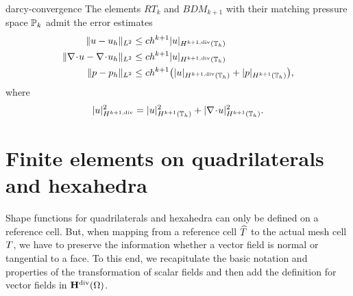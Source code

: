 \begin{Corollary}{darcy-convergence}
  The elements $RT_k$ and $BDM_{k+1}$ with their matching pressure
  space $\P_k$ admit the error estimates
  \begin{align}
    \norm{u-u_h}_{L^2} &\le c h^{k+1} \snorm{u}_{H^{k+1,\text{div}}(\mesh_h)} \\
    \norm{\div u-\div u_h}_{L^2} &\le c h^{k+1} \snorm{u}_{H^{k+1,\text{div}}(\mesh_h)} \\
    \norm{p-p_h}_{L^2} &\le c h^{k+1}
                         \bigl(\snorm{u}_{H^{k+1,\text{div}}(\mesh_h)}
    + \snorm{p}_{H^{k+1}(\mesh_h)} \bigr),
  \end{align}
  where
  \begin{gather}
    \snorm{u}_{H^{k+1,\text{div}}}^2 = \snorm{u}_{H^{k+1}(\mesh_h)}^2
    + \snorm{\div u}_{H^{k+1}(\mesh_h)}^2.
  \end{gather}
\end{Corollary}

\section{Finite elements on quadrilaterals and hexahedra}

\begin{intro}
  Shape functions for quadrilaterals and hexahedra can only be defined
  on a reference cell. But, when mapping from a reference cell
  $\refcell$ to the actual mesh cell $\cell$, we have to preserve the
  information whether a vector field is normal or tangential to a
  face. To this end, we recapitulate the basic notation and properties
  of the transformation of scalar fields and then add the definition
  for vector fields in $\Hdiv(\domain)$.
\end{intro}

